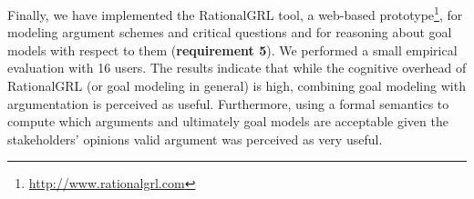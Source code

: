 Finally, we have implemented the RationalGRL tool, a web-based prototype\footnote{\url{http://www.rationalgrl.com}}, for modeling argument schemes and critical questions and for reasoning about goal models with respect to them (\textbf{requirement 5}). We performed a small empirical evaluation with 16 users. The results indicate that while the cognitive overhead of RationalGRL (or goal modeling in general) is high, combining goal modeling with argumentation is perceived as useful. Furthermore, using a formal semantics to compute which arguments and ultimately goal models are acceptable given the stakeholders' opinions valid argument was perceived as very useful.
